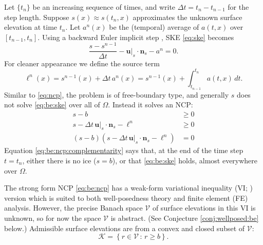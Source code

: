 \documentclass[hidelinks,onefignum,onetabnum,final]{siamart220329}  %
\newcommand{\bn}{\mathbf{n}}
\newcommand{\bu}{\mathbf{u}}
\newcommand{\cK}{\mathcal{K}}
\newcommand{\cV}{\mathcal{V}}
\begin{document}
Let $\{t_n\}$ be an increasing sequence of times, and write $\Delta t = t_n-t_{n-1}$ for the step length.  Suppose $s(x)\approx s(t_n,x)$ approximates the unknown surface elevation at time $t_n$.  Let $a^n(x)$ be the (temporal) average of $a(t,x)$ over $[t_{n-1},t_n]$.  Using a backward Euler implicit step \cite{AscherPetzold1998}, SKE \eqref{eq:ske} becomes
\begin{equation}
\frac{s - s^{n-1}}{\Delta t} - \bu|_{s} \cdot \bn_{s} - a^n = 0. \label{eq:be:ske}
\end{equation}
For cleaner appearance we define the source term
\begin{equation}
\ell^n(x) = s^{n-1}(x)+\Delta t\,a^n(x) = s^{n-1}(x) + \int_{t_{n-1}}^{t_n} a(t,x)\,dt. \label{eq:be:source}
\end{equation}
Similar to \eqref{eq:ncp}, the problem is of free-boundary type, and generally $s$ does not solve \eqref{eq:be:ske} over all of $\Omega$.  Instead it solves an NCP:
\begin{subequations}
\label{eq:be:ncp}
\begin{align}
s - b &\ge 0 \label{eq:be:ncp:constraint} \\
s - \Delta t\,\bu|_s \cdot \bn_s - \ell^n &\ge 0 \\
(s - b) \left(s - \Delta t\,\bu|_s \cdot \bn_s - \ell^n\right) &= 0 \label{eq:be:ncp:complementarity}
\end{align}
\end{subequations}
Equation \eqref{eq:be:ncp:complementarity} says that, at the end of the time step $t=t_n$, either there is no ice ($s=b$), or that \eqref{eq:be:ske} holds, almost everywhere over $\Omega$.

The strong form NCP \eqref{eq:be:ncp} has a weak-form variational inequality (VI; \cite{KinderlehrerStampacchia1980}) version which is suited to both well-posedness theory and finite element (FE) analysis.  However, the precise Banach space $\cV$ of surface elevations in this VI is unknown, so for now the space $\cV$ is abstract.  (See Conjecture \ref{conj:wellposed:be} below.)  Admissible surface elevations are from a convex and closed subset of $\cV$:
\begin{equation}
\cK = \left\{r \in\cV\,:\,r \ge b\right\}.  \label{eq:be:admissible}
\end{equation}
\end{document}
